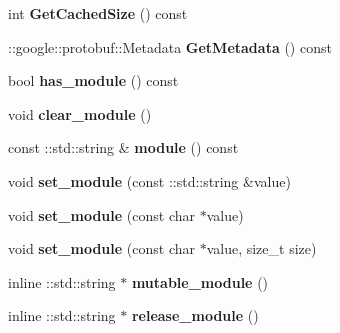\begin{DoxyCompactItemize}
int {\bfseries Get\+Cached\+Size} () const
\item 
\mbox{\label{classcaffe_1_1_python_parameter_a99e18e8578f09dc51e54c10c75c17b29}} 
\+::google\+::protobuf\+::\+Metadata {\bfseries Get\+Metadata} () const
\item 
\mbox{\label{classcaffe_1_1_python_parameter_a37bad682d024bf86b9a7a32568a8aea9}} 
bool {\bfseries has\+\_\+module} () const
\item 
\mbox{\label{classcaffe_1_1_python_parameter_ab7b8fae95d2350c8f30b1a4df5b139a4}} 
void {\bfseries clear\+\_\+module} ()
\item 
\mbox{\label{classcaffe_1_1_python_parameter_a004949d1b369bb45745e0ac0af935d7f}} 
const \+::std\+::string \& {\bfseries module} () const
\item 
\mbox{\label{classcaffe_1_1_python_parameter_af4252ab7552a9fbccb421c08e0d7480c}} 
void {\bfseries set\+\_\+module} (const \+::std\+::string \&value)
\item 
\mbox{\label{classcaffe_1_1_python_parameter_ac354afe9509dc443de8cd2e679d419a5}} 
void {\bfseries set\+\_\+module} (const char $\ast$value)
\item 
\mbox{\label{classcaffe_1_1_python_parameter_ad4049c5f7e99ba0becb273dffaf635ff}} 
void {\bfseries set\+\_\+module} (const char $\ast$value, size\+\_\+t size)
\item 
\mbox{\label{classcaffe_1_1_python_parameter_a9205edd10fdd527eb700a013254e871b}} 
inline \+::std\+::string $\ast$ {\bfseries mutable\+\_\+module} ()
\item 
\mbox{\label{classcaffe_1_1_python_parameter_a2c54027b1e3fdf7c64b2f1819a546db9}} 
inline \+::std\+::string $\ast$ {\bfseries release\+\_\+module} ()
\item 
\mbox{\label{classcaffe_1_1_python_parameter_a4062b94b90fdccf1a7a68b94de44f869}} 

\end{DoxyCompactItemize}
